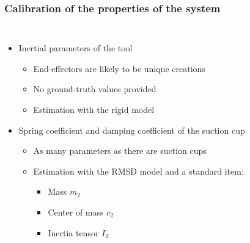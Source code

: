 \documentclass[aspectratio=1610]{beamer}
\begin{document}
\begin{frame}
\frametitle{Calibration of the properties of the system}
\begin{columns}
\column{37em}
\begin{itemize}\itemsep1em
  \justifying
  \item Inertial parameters of the tool
  \begin{itemize}
    \item End-effectors are likely to be unique creations
    \item No ground-truth values provided
    \item Estimation with the rigid model
  \end{itemize}
  \item Spring coefficient and damping coefficient of the suction cup
  \begin{itemize}
    \item As many parameters as there are suction cups
    \item Estimation with the RMSD model and a standard item:
    \begin{itemize}
      \item Mass $m_2$
      \item Center of mass $c_2$
      \item Inertia tensor $I_2$
    \end{itemize}
  \end{itemize}
\end{itemize}
\end{columns}
\end{frame}
\end{document}
